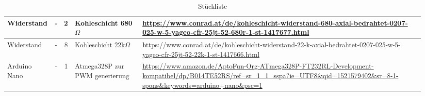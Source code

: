 \begin{table}[htb]
\begin{tiny}
\begin{tabular}{|p{2cm}|c|c|p{3cm}|p{7cm}|}
Widerstand & - & 2 & Kohleschicht 680$\Omega$ & \url{https://www.conrad.at/de/kohleschicht-widerstand-680-axial-bedrahtet-0207-025-w-5-yageo-cfr-25jt-52-680r-1-st-1417677.html} \\ \hline
Widerstand & - & 8 & Kohleschicht 22k$\Omega$ & \url{https://www.conrad.at/de/kohleschicht-widerstand-22-k-axial-bedrahtet-0207-025-w-5-yageo-cfr-25jt-52-22k-1-st-1417666.html} \\ \hline
Arduino Nano & - & 1 & Atmega328P zur PWM generierung & \url{https://www.amazon.de/AptoFun-Org-ATmega328P-FT232RL-Development-kompatibel/dp/B014TE52RS/ref=sr_1_1_sspa?ie=UTF8&qid=1521579402&sr=8-1-spons&keywords=arduino+nano&psc=1} \\ \hline
\end{tabular}
\caption{Stückliste}
\label{Parts list}
\end{tiny}
\end{table}

